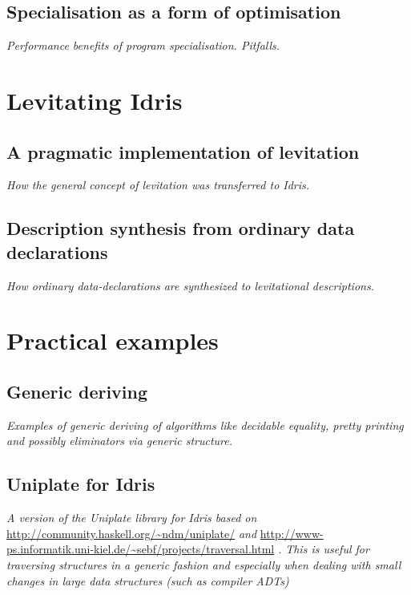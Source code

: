 \documentclass{ituthesis}
\theoremstyle{definition}
\begin{document}
\section{Specialisation as a form of optimisation}
\label{sec:SpecialisationasaFormofOptimization}
\textit{Performance benefits of program specialisation. Pitfalls.}

\chapter{Levitating Idris}
\label{cha:LevitatingIdris}

\section{A pragmatic implementation of levitation}
\label{sec:APragmaticImplementationofLevitation}
\textit{How the general concept of levitation was transferred to Idris.}

\section{Description synthesis from ordinary data declarations}
\label{sec:DescriptionSynthesisFromOrdinaryDataDeclarations}
\textit{How ordinary data-declarations are synthesized to levitational descriptions.}

\chapter{Practical examples}
\label{cha:PracticalExamples}

\section{Generic deriving}
\label{sec:GenericDeriving}
\textit{Examples of generic deriving of algorithms like decidable equality, pretty printing and possibly eliminators via generic structure.}

\section{Uniplate for Idris}
\label{sec:UniplateforIdris}
\textit{A version of the Uniplate library for Idris based on} \url{http://community.haskell.org/~ndm/uniplate/} \textit{and} \url{http://www-ps.informatik.uni-kiel.de/~sebf/projects/traversal.html} \textit{.
This is useful for traversing structures in a generic fashion and especially when dealing with small changes in large data structures (such as compiler ADTs)}
\end{document}
